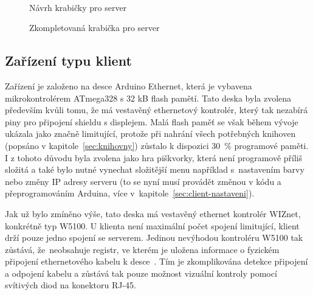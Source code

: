 \begin{figure}[hbtp]
\begin{minipage}[c]{\textwidth/2-.7cm}
\end{minipage}
\\
\begin{minipage}[c]{\textwidth/2-0.5cm}
\caption{\label{fig:server_navrh}Návrh krabičky pro server\newline}
\end{minipage}
\begin{minipage}[c]{\textwidth/2-.5cm}
\caption{\label{fig:server_realizace}Zkompletovaná krabička pro server}
\end{minipage}
\end{figure}





\subsection{Zařízení typu klient}
\label{sec:HWclient}
Zařízení je založeno na desce Arduino Ethernet, která je vybavena mikrokontrolérem ATmega328 s 32 kB flash pamětí. Tato deska byla zvolena především kvůli tomu, že má vestavěný ethernetový kontrolér, který tak nezabírá piny pro připojení shieldu s displejem. Malá flash paměť se však během vývoje ukázala jako značně limitující, protože při nahrání všech potřebných knihoven (popsáno v kapitole~\ref{sec:knihovny}) zůstalo k dispozici 30~\% programové paměti. I z tohoto důvodu byla zvolena jako hra piškvorky, která není programově příliš složitá a také bylo nutné vynechat složitější menu například s~nastavením barvy nebo změny IP adresy serveru (to se nyní musí provádět změnou v kódu a přeprogramováním Arduina, více v~kapitole~\ref{sec:client-nastaveni}).

Jak už bylo zmíněno výše, tato deska má vestavěný ethernet kontrolér WIZnet, konkrétně typ W5100. U klienta není maximální počet spojení limitující, klient drží pouze jedno spojení se serverem. Jedinou nevýhodou kontroléru W5100 tak zůstává, že~neobsahuje registr, ve kterém je uložena informace o fyzickém připojení ethernetového kabelu k desce~\cite{datasheet_w5100}. Tím je zkomplikována detekce připojení a odpojení kabelu a zůstává tak pouze možnost vizuální kontroly pomocí svítivých diod na konektoru RJ-45.

